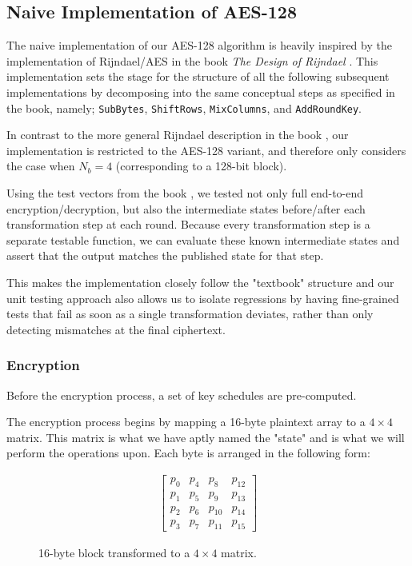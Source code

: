 \subsection{Naive Implementation of AES-128}

The naive implementation of our AES-128 algorithm is heavily inspired by the implementation of Rijndael/AES in the book \textit{The Design of Rijndael} \cite{rijndael}. This implementation sets the stage for the structure of all the following subsequent implementations by decomposing into the same conceptual steps as specified in the book, namely; \texttt{SubBytes}, \texttt{ShiftRows}, \texttt{MixColumns}, and \texttt{AddRoundKey}.

In contrast to the more general Rijndael description in the book \cite{rijndael},
our implementation is restricted to the AES-128 variant, and therefore
only considers the case when $N_{b} = 4$ (corresponding to a 128-bit block).

Using the test vectors from the book \cite{rijndael_test_vectors}, we tested not only full end-to-end encryption/decryption, but also the intermediate states before/after each transformation step at each round. Because every transformation step is a separate testable function, we can evaluate these known intermediate states and assert that the output matches the published state for that step.

This makes the implementation closely follow the "textbook" structure and our unit testing approach also allows us to isolate regressions by having fine-grained tests that fail as soon as a single transformation deviates, rather than only detecting mismatches at the final ciphertext.

\subsubsection{Encryption}

Before the encryption process, a set of key schedules are pre-computed.

The encryption process begins by mapping a 16-byte plaintext array to a $4 \times 4$ matrix. This matrix is what we have aptly named the "state" and is what we will perform the operations upon. Each byte is arranged in the following form:

\begin{figure}[H]
    \begin{align*}
        \begin{bmatrix}
            p_{0} & p_{4} & p_{8} & p_{12} \\
            p_{1} & p_{5} & p_{9} & p_{13} \\
            p_{2} & p_{6} & p_{10} & p_{14} \\
            p_{3} & p_{7} & p_{11} & p_{15}
        \end{bmatrix}
    \end{align*}
    \caption{16-byte block transformed to a $4 \times 4$ matrix.}
    \label{fig:state_matrix}
\end{figure}

